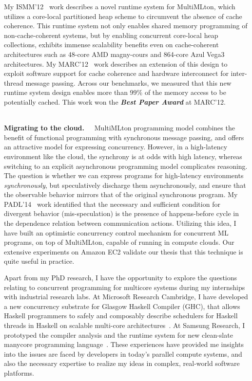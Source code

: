 \documentclass[screen,acmsmall,nonacm]{acmart}
\newcommand{\loud}[1]{\textbf{\textit{#1}}}
\newcommand{\R}[1]{~\\[-2mm] \noindent \textbf{#1.~~}}
\begin{document}
My ISMM'12~\cite{mmgc} work describes a novel runtime system for MultiMLton,
which utilizes a core-local partitioned heap scheme to circumvent the absence
of cache coherence. This runtime system not only enables shared memory
programming of non-cache-coherent systems, but by enabling concurrent
core-local heap collections, exhibits immense scalability benefits even on
cache-coherent architectures such as 48-core AMD magny-cours and 864-core Azul
Vega3 architectures. My MARC'12~\cite{KC_MARC12} work describes an extension of
this design to exploit software support for cache coherence and hardware
interconnect for inter-thread message passing. Across our benchmarks, we
measured that this new runtime system design enables more than 99\% of the
memory access to be potentially cached. This work won the \loud{Best Paper
Award} at MARC'12.

\R{Migrating to the cloud} MultiMLton programming model combines the
benefit of functional programming with synchronous message passing, and offers
an attractive model for expressing concurrency. However, in a high-latency
environment like the cloud, the synchrony is at odds with high latency, whereas
switching to an explicit asynchronous programming model complicates reasoning.
The question is whether we can express programs for high-latency environments
\emph{synchronously}, but speculatively discharge them asynchronously, and
ensure that the observable behavior mirrors that of the original synchronous
program. My PADL'14~\cite{RxCML} work identified that the necessary and
sufficient condition for divergent behavior (mis-speculation) is the presence
of happens-before cycle in the dependence relation between communication
actions. Utilizing this idea, I have built an optimistic concurrency control
mechanism for concurrent ML programs, on top of MultiMLton, capable of running
in compute clouds. Our extensive experiments on Amazon EC2 validate our thesis
that this technique is quite useful in practice.

Apart from my PhD research, I have the opportunity to explore the questions
relating to concurrent programming for multicore systems during my internships
with industrial research labs. At Microsoft Research Cambridge, I have
developed a new concurrency substrate for Glasgow Haskell Compiler (GHC), that
allows Haskell programmers to safely and composably describe schedulers for
Haskell threads in Haskell on scalable multi-core architectures~\cite{CompSA}.
At Samsung Research, I prototyped the compiler analysis and the runtime system
for new clean-slate manycore programming language~\cite{SPARTA}. These
experiences have provided me insights into the issues are faced by developers
in today's parallel compute systems, and also the necessary expertise to
realize my ideas in complex, real-world software platforms.
\end{document}
